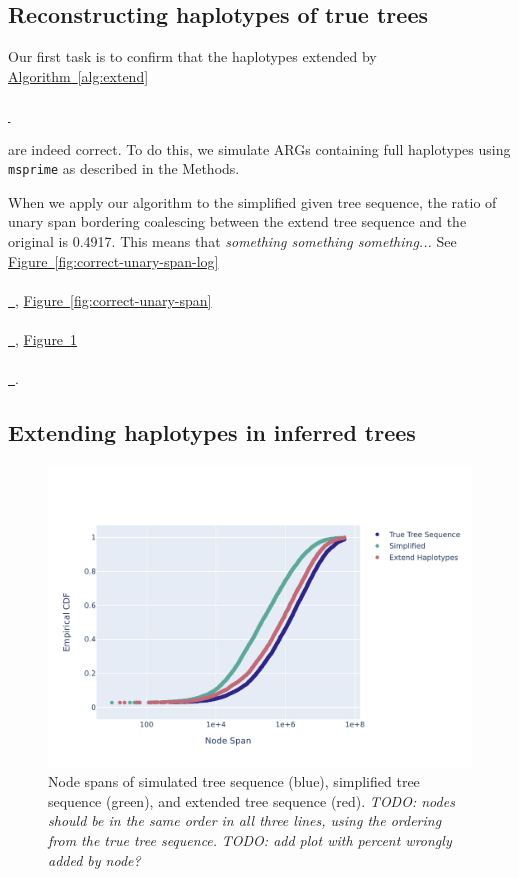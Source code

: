 \documentclass[10pt,twoside,lineno]{gsajnl}
\newcommand{\msprime}{\texttt{msprime}}
\newcommand{\comment}[1]{{\color{violet} \it #1}}
\newcommand{\algorithmref}[2][]{%
	\hyperref[{#2}]{%
		Algorithm~\ref*{#2}%
		\ifx\\#1\\%
		\else
		\,#1%
		\fi
	}%
}
\newcommand*{\figref}[2][]{%
	\hyperref[{#2}]{%
		Figure~\ref*{#2}%
		\ifx\\#1\\%
		\else
		\,#1%
		\fi
	}%
}
\begin{document}
\subsection{Reconstructing haplotypes of true trees}

Our first task is to confirm that the haplotypes extended by \algorithmref{alg:extend}
are indeed correct.
To do this, we simulate ARGs containing full haplotypes using \msprime
as described in the Methods.

When we apply our algorithm to the simplified given tree sequence, the ratio of unary span bordering coalescing between the extend tree sequence and the original is 0.4917. This means that \comment{something something something...}  
See \figref{fig:correct-unary-span-log}, \figref{fig:correct-unary-span}, \figref{fig:node-spans}.


%
%

\subsection{Extending haplotypes in inferred trees}

\begin{figure}[bht]
	\includegraphics[width=0.9\linewidth]{newplots_wo_ee/node_spans_wo_trapped_unary_regions_CDF.pdf}
	\caption{
        Node spans of simulated tree sequence (blue), simplified tree sequence (green), and extended tree sequence (red).
        \comment{TODO: nodes should be in the same order in all three lines,
        using the ordering from the true tree sequence.}
        \comment{TODO: add plot with percent wrongly added by node?}
    }
	\label{fig:node-spans}
\end{figure}
\end{document}
